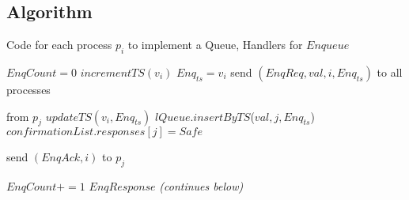 \documentclass[a4paper,USenglish]{lipics-v2021} %
\begin{document}
\subsection{Algorithm}

\begin{algorithm}
  \caption{Code for each process $p_i$ to implement a Queue, Handlers for $Enqueue$}\label{alg:fifo}
  \begin{algorithmic}[1]
      \State $EnqCount = 0$
      \State $incrementTS(v_i)$
      \State $Enq_{ts} = v_i$
      \State send $(EnqReq, val, i, Enq_{ts})$ to all processes
    \EndFunction

     from $p_j$
      \State $updateTS(v_i, Enq_{ts})$
      \State $lQueue.insertByTS$($val, j, Enq_{ts}$)
          \State $confirmationList.responses[j] = Safe$
        \EndIf
      \EndFor

      \State send $(EnqAck, i)$ to $p_j$
    \EndFunction

      \State $EnqCount += 1$
        \Return $EnqResponse$
      \EndIf
    \EndFunction
    \Statex
    \Statex \emph{(continues below)}
  \end{algorithmic}
\end{algorithm}
\end{document}
